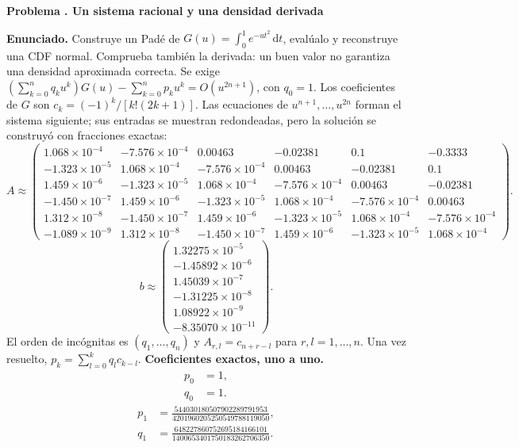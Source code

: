 \documentclass[11pt,a4paper]{article}
\newcommand{\dd}{\,\mathrm d}
\theoremstyle{definition}
\newcounter{problema}
\newenvironment{resuelto}[1]{\refstepcounter{problema}\par\medskip\Needspace{6\baselineskip}\textbf{Problema \theproblema. #1}\par}{\par\medskip}
\begin{document}
\begin{resuelto}{Un sistema racional y una densidad derivada}
\textbf{Enunciado.} Construye un Padé de $G(u)=\int_0^1e^{-ut^2}\dd t$, evalúalo y reconstruye una CDF normal. Comprueba también la derivada: un buen valor no garantiza una densidad aproximada correcta.
Se exige $(\sum_{k=0}^{n}q_ku^k)G(u)-\sum_{k=0}^{n}p_ku^k=O(u^{2n+1})$, con $q_0=1$. Los coeficientes de $G$ son $c_k=(-1)^k/[k!(2k+1)]$.
Las ecuaciones de $u^{n+1},\ldots,u^{2n}$ forman el sistema siguiente; sus entradas se muestran redondeadas, pero la solución se construyó con fracciones exactas:
{\small
\[
A\approx\begin{pmatrix}1.068\times10^{-4}&-7.576\times10^{-4}&0.00463&-0.02381&0.1&-0.3333\\-1.323\times10^{-5}&1.068\times10^{-4}&-7.576\times10^{-4}&0.00463&-0.02381&0.1\\1.459\times10^{-6}&-1.323\times10^{-5}&1.068\times10^{-4}&-7.576\times10^{-4}&0.00463&-0.02381\\-1.450\times10^{-7}&1.459\times10^{-6}&-1.323\times10^{-5}&1.068\times10^{-4}&-7.576\times10^{-4}&0.00463\\1.312\times10^{-8}&-1.450\times10^{-7}&1.459\times10^{-6}&-1.323\times10^{-5}&1.068\times10^{-4}&-7.576\times10^{-4}\\-1.089\times10^{-9}&1.312\times10^{-8}&-1.450\times10^{-7}&1.459\times10^{-6}&-1.323\times10^{-5}&1.068\times10^{-4}\end{pmatrix}.
\]
\[
b\approx\begin{pmatrix}1.32275\times10^{-5}\\-1.45892\times10^{-6}\\1.45039\times10^{-7}\\-1.31225\times10^{-8}\\1.08922\times10^{-9}\\-8.35070\times10^{-11}\end{pmatrix}.
\]
}
El orden de incógnitas es $(q_1,\ldots,q_n)$ y $A_{r,l}=c_{n+r-l}$ para $r,l=1,\ldots,n$. Una vez resuelto, $p_k=\sum_{l=0}^{k}q_lc_{k-l}$.
\textbf{Coeficientes exactos, uno a uno.}
\[
\begin{aligned}p_0&=1,\\q_0&=1.\end{aligned}
\]
\[
\begin{aligned}p_1&=\frac{544030180507902289791953}{4201960205250549788119050},\\q_1&=\frac{648227860752695184166101}{1400653401750183262706350}.\end{aligned}
\]
\end{resuelto}
\end{document}
